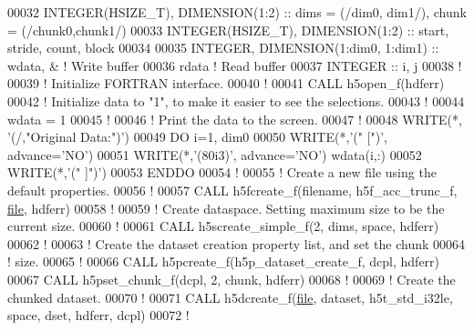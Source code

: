\begin{DoxyCode}
00032   \textcolor{keywordtype}{INTEGER(HSIZE\_T)}, \textcolor{keywordtype}{DIMENSION(1:2)}   :: dims = (/dim0, dim1/), chunk = (/chunk0,chunk1/)
00033   \textcolor{keywordtype}{INTEGER(HSIZE\_T)}, \textcolor{keywordtype}{DIMENSION(1:2)}   :: start, stride, count, block
00034 
00035   \textcolor{keywordtype}{INTEGER}, \textcolor{keywordtype}{DIMENSION(1:dim0, 1:dim1)} :: wdata, & \textcolor{comment}{! Write buffer}
00036                                         rdata    \textcolor{comment}{! Read buffer}
00037   \textcolor{keywordtype}{INTEGER} :: i, j
00038   \textcolor{comment}{!}
00039   \textcolor{comment}{! Initialize FORTRAN interface.}
00040   \textcolor{comment}{!}
00041   \textcolor{keyword}{CALL }h5open\_f(hdferr)
00042   \textcolor{comment}{! Initialize data to "1", to make it easier to see the selections.}
00043   \textcolor{comment}{!}
00044   wdata = 1
00045   \textcolor{comment}{!}
00046   \textcolor{comment}{! Print the data to the screen.}
00047   \textcolor{comment}{!}
00048   \textcolor{keyword}{WRITE}(*, \textcolor{stringliteral}{'(/,"Original Data:")'})
00049   \textcolor{keywordflow}{DO} i=1, dim0
00050      \textcolor{keyword}{WRITE}(*,\textcolor{stringliteral}{'(" [")'}, advance=\textcolor{stringliteral}{'NO'})
00051      \textcolor{keyword}{WRITE}(*,\textcolor{stringliteral}{'(80i3)'}, advance=\textcolor{stringliteral}{'NO'}) wdata(i,:)
00052      \textcolor{keyword}{WRITE}(*,\textcolor{stringliteral}{'(" ]")'})
00053 \textcolor{keywordflow}{  ENDDO}
00054   \textcolor{comment}{!}
00055   \textcolor{comment}{! Create a new file using the default properties.}
00056   \textcolor{comment}{!}
00057   \textcolor{keyword}{CALL }h5fcreate\_f(filename, h5f\_acc\_trunc\_f, \hyperlink{structfile}{file}, hdferr)
00058   \textcolor{comment}{!}
00059   \textcolor{comment}{! Create dataspace.  Setting maximum size to be the current size.}
00060   \textcolor{comment}{!}
00061   \textcolor{keyword}{CALL }h5screate\_simple\_f(2, dims, space, hdferr)
00062   \textcolor{comment}{!}
00063   \textcolor{comment}{! Create the dataset creation property list, and set the chunk}
00064   \textcolor{comment}{! size.}
00065   \textcolor{comment}{!}
00066   \textcolor{keyword}{CALL }h5pcreate\_f(h5p\_dataset\_create\_f, dcpl, hdferr)
00067   \textcolor{keyword}{CALL }h5pset\_chunk\_f(dcpl, 2, chunk, hdferr)
00068   \textcolor{comment}{!}
00069   \textcolor{comment}{! Create the chunked dataset.}
00070   \textcolor{comment}{!}
00071   \textcolor{keyword}{CALL }h5dcreate\_f(\hyperlink{structfile}{file}, dataset, h5t\_std\_i32le, space, dset, hdferr, dcpl)
00072   \textcolor{comment}{!}

\end{DoxyCode}
